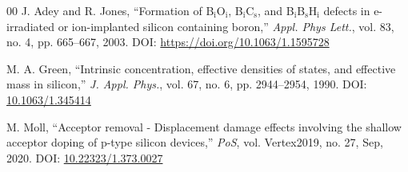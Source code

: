 \documentclass[final, 5p, times]{elsarticle}
\begin{document}
\begin{thebibliography}{00}
 J. Adey and R. Jones, ``Formation of B$_\text{i}$O$_\text{i}$, B$_\text{i}$C$_\text{s}$, and B$_\text{i}$B$_\text{s}$H$_\text{i}$
defects in e-irradiated or ion-implanted silicon containing boron,''
\textit{Appl. Phys Lett.}, vol. 83, no. 4, pp. 665--667, 2003.
DOI:
\href{https://doi.org/10.1063/1.1595728}{https://doi.org/10.1063/1.1595728}



  M. A. Green, ``Intrinsic concentration, effective densities of
states, and effective mass in silicon,'' \textit{J. Appl. Phys.}, vol. 67, no.
6, pp. 2944--2954, 1990. 
DOI: \href{https://aip.scitation.org/doi/10.1063/1.345414}{10.1063/1.345414}




 M. Moll, ``Acceptor removal - Displacement damage effects involving the shallow acceptor doping of p-type
silicon devices,'' \textit{PoS}, vol. Vertex2019, no. 27, Sep, 2020.
DOI: \href{https://pos.sissa.it/373/027/}{10.22323/1.373.0027}

\end{thebibliography}
\end{document}

